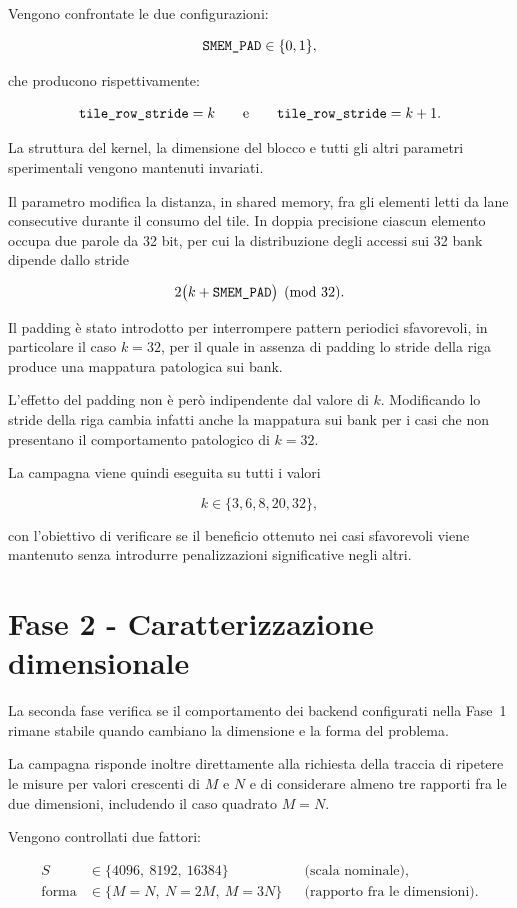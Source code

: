 Vengono confrontate le due configurazioni:

\[
\texttt{SMEM\_PAD}\in\{0,1\},
\]

che producono rispettivamente:

\[
\texttt{tile\_row\_stride}=k
\qquad
\text{e}
\qquad
\texttt{tile\_row\_stride}=k+1.
\]

La struttura del kernel, la dimensione del blocco e tutti gli altri
parametri sperimentali vengono mantenuti invariati.

Il parametro modifica la distanza, in shared memory, fra gli elementi
letti da lane consecutive durante il consumo del tile. In doppia
precisione ciascun elemento occupa due parole da 32 bit, per cui la
distribuzione degli accessi sui 32 bank dipende dallo stride

\[
2\bigl(k+\texttt{SMEM\_PAD}\bigr)
\pmod{32}.
\]

Il padding è stato introdotto per interrompere pattern periodici
sfavorevoli, in particolare il caso $k=32$, per il quale in assenza di
padding lo stride della riga produce una mappatura patologica sui bank.

L'effetto del padding non è però indipendente dal valore di $k$.
Modificando lo stride della riga cambia infatti anche la mappatura sui
bank per i casi che non presentano il comportamento patologico di
$k=32$.

La campagna viene quindi eseguita su tutti i valori

\[
k\in\{3,6,8,20,32\},
\]

con l'obiettivo di verificare se il beneficio ottenuto nei casi
sfavorevoli viene mantenuto senza introdurre penalizzazioni significative
negli altri.

\section{Fase 2 - Caratterizzazione dimensionale}
\label{sec:fase2-dimensione}

La seconda fase verifica se il comportamento dei backend configurati nella
Fase~1 rimane stabile quando cambiano la dimensione e la forma del problema.

La campagna risponde inoltre direttamente alla richiesta della traccia di
ripetere le misure per valori crescenti di $M$ e $N$ e di considerare
almeno tre rapporti fra le due dimensioni, includendo il caso quadrato
$M=N$.

Vengono controllati due fattori:

\begin{align}
S &\in \{4096,\ 8192,\ 16384\}
&& \text{(scala nominale)}, \\
\text{forma}
&\in \{M=N,\ N=2M,\ M=3N\}
&& \text{(rapporto fra le dimensioni)}.
\end{align}

